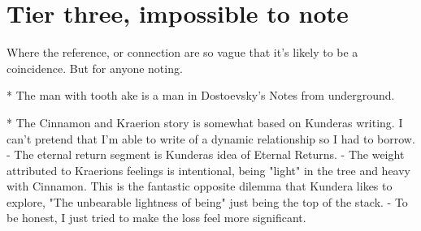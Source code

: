 \section{Tier three, impossible to note}

Where the reference, or connection are so vague that it's likely to be a coincidence.
But for anyone noting.

* The man with tooth ake is a man in Dostoevsky's Notes from underground.

* The Cinnamon and Kraerion story is somewhat based on Kunderas writing. I can't 
pretend that I'm able to write of a dynamic relationship so I had to borrow.
- The eternal return segment is Kunderas idea of Eternal Returns.
- The weight attributed to Kraerions feelings is intentional, being "light" in
the tree and heavy with Cinnamon. This is the fantastic opposite dilemma that
Kundera likes to explore, "The unbearable lightness of being" just being the 
top of the stack.
- To be honest, I just tried to make the loss feel more significant.
